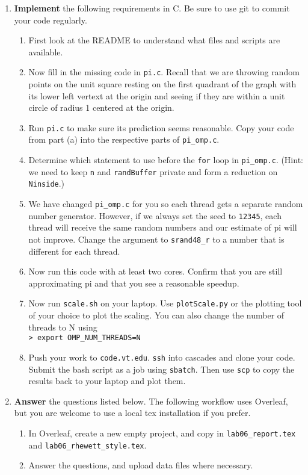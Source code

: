 \documentclass[letter]{article}
\begin{document}
\begin{enumerate}
    \item \textbf{Implement} the following requirements in C.  Be sure to use git to commit your code regularly.
        \begin{enumerate}
            \item First look at the README to understand what files and scripts are available.
            \item Now fill in the missing code in \texttt{pi.c}. Recall that we are throwing random points on the unit square resting on the first quadrant of the graph with its lower left vertext at the origin and seeing if they are within a unit circle of radius 1 centered at the origin. 
            \item Run \texttt{pi.c} to make sure its prediction seems reasonable.
            \tem Copy your code from part (a) into the respective parts of \texttt{pi\_omp.c}.
            \item Determine which statement to use before the \texttt{for} loop in \texttt{pi\_omp.c}. (Hint: we need to keep \texttt{n} and \texttt{randBuffer} private and form a reduction on \texttt{Ninside}.)
            \item We have changed \texttt{pi\_omp.c} for you so each thread gets a separate random number generator.  However, if we always set the seed to \texttt{12345}, each thread will receive the same random numbers and our estimate of pi will not improve.  Change the argument to \texttt{srand48\_r} to a number that is different for each thread.  
            \item Now run this code with at least two cores. Confirm that you are still approximating pi and that you see a reasonable speedup.
            \item Now run \texttt{scale.sh} on your laptop. Use \texttt{plotScale.py} or the plotting tool of your choice to plot the scaling. You can also change the number of threads to N using\\
            \texttt{> export OMP\_NUM\_THREADS=N} 
            \item Push your work to \texttt{code.vt.edu}. \texttt{ssh} into cascades and clone your code. Submit the bash script as a job using \texttt{sbatch}. Then use \texttt{scp} to copy the results back to your laptop and plot them.  
        \end{enumerate}
            
    \item \textbf{Answer} the questions listed below.  The following workflow uses Overleaf, but you are welcome to use a local tex installation if you prefer.
        \begin{enumerate}
            \item In Overleaf, create a new empty project, and copy in \texttt{lab06\_report.tex} and \texttt{lab06\_rhewett\_style.tex}.
            \item Answer the questions, and upload data files where necessary.
        \end{enumerate}


\end{enumerate}
\end{document}
